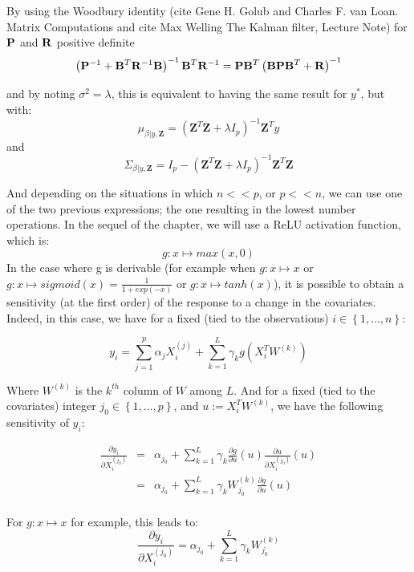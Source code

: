 \medskip

By using the Woodbury identity (cite Gene H. Golub and Charles F. van Loan. Matrix Computations and cite Max Welling The Kalman filter, Lecture Note) for ${\bf P}$ and ${\bf R}$ positive definite
$$
\left({\bf P}^{-1} + {\bf B}^T {\bf R}^{-1} {\bf B} \right)^{-1}{\bf B}^T {\bf R}^{-1} =
{\bf P}{\bf B}^T \left( {\bf B} {\bf P} {\bf B}^T + {\bf R}\right)^{-1}
$$

and by noting $\sigma^2 = \lambda$, this is equivalent to having the same result for $y^*$, but with: 
$$
\mu_{\beta | y, \textbf{Z}} =  \left( \textbf{Z}^T\textbf{Z} + \lambda I_p\right)^{-1}\textbf{Z}^Ty
$$
and 
$$
\Sigma_{\beta | y, \textbf{Z}} = I_p -  \left( \textbf{Z}^T\textbf{Z} + \lambda I_p\right)^{-1}\textbf{Z}^T\textbf{Z}
$$

And depending on the situations in which $n << p$, or $p << n$, we can use one of the two previous expressions; the one resulting in the lowest number operations. In the sequel of the chapter, we will use a ReLU activation function, which is:
$$
g: x \mapsto max(x, 0)
$$ 
In the case where g is derivable (for example when 
$
g: x \mapsto x
$ or 
$
g: x \mapsto sigmoid(x) = \frac{1}{1 + exp(-x)}
$
or 
$
g: x \mapsto tanh(x)
$), it is possible to obtain a sensitivity (at the first order) of the response to a change in the covariates. Indeed, in this case, we have for a fixed (tied to the observations) $i \in \left \lbrace 1, \ldots, n \right \rbrace $: 

$$
y_i = \sum_{j = 1}^p \alpha_j X_i^{(j)} + \sum_{k = 1}^L \gamma_k g(X_i^T W^{(k)})
$$

Where $W^{(k)}$ is the $k^{th}$ column of $W$ among $L$. And for a fixed (tied to the covariates) integer $j_0 \in \left \lbrace 1, \ldots, p \right \rbrace$, and $u := X_i^T W^{(k)}$, we have the following sensitivity of $y_i$: 

\begin{eqnarray*}
\frac{\partial y_i}{\partial X_i^{(j_0)}} &=& \alpha_{j_0} + \sum_{k = 1}^L \gamma_k \frac{\partial g}{\partial u}(u)\frac{\partial u}{\partial X_i^{(j_0)}}(u) \\
 &=& \alpha_{j_0} + \sum_{k = 1}^L \gamma_k W_{j_0}^{(k)} \frac{\partial g}{\partial u}(u)\\
\end{eqnarray*}

For $g: x \mapsto x$ for example, this leads to: 
$$
\frac{\partial y_i}{\partial X_i^{(j_0)}} = \alpha_{j_0} + \sum_{k = 1}^L \gamma_k W_{j_0}^{(k)}
$$

